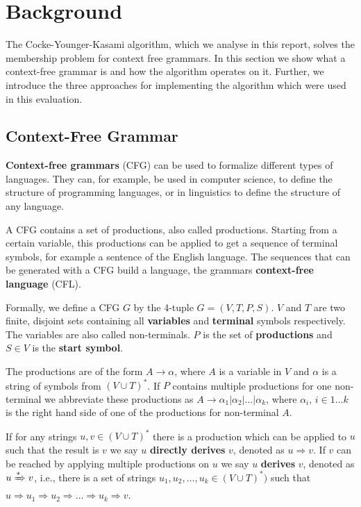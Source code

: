 \section{Background}

The Cocke-Younger-Kasami algorithm, which we analyse in this report, solves the membership problem for context free grammars.
In this section we show what a context-free grammar is and how the algorithm operates on it.
Further, we introduce the three approaches for implementing the algorithm which were used in this evaluation.

\subsection{Context-Free Grammar}

\textbf{Context-free grammars} (CFG) can be used to formalize different types of languages.
They can, for example, be used in computer science, to define the structure of programming languages, or in linguistics to define the structure of any language.

A CFG contains a set of productions, also called productions.
Starting from a certain variable, this productions can be applied to get a sequence of terminal symbols, for example a sentence of the English language.
The sequences that can be generated with a CFG build a language, the grammars \textbf{context-free language} (CFL).

Formally, we define a CFG $G$ by the 4-tuple $G=(V,T,P,S)$.
$V$ and $T$ are two finite, disjoint sets containing all \textbf{variables} and \textbf{terminal} symbols respectively.
The variables are also called non-terminals.
$P$ is the set of \textbf{productions} and $S\in V$ is the \textbf{start symbol}.

The productions are of the form $A\rightarrow\alpha$, where $A$ is a variable in $V$ and $\alpha$ is a string of symbols from $(V\cup T)^*$.
If $P$ contains multiple productions for one non-terminal we abbreviate these productions as $A\rightarrow \alpha_1 | \alpha_2 | \dots |\alpha_k $, where $\alpha_i$, $i\in {1\dots k}$ is the right hand side of one of the productions for non-terminal $A$.

If for any strings $u,v\in (V\cup T)^*$ there is a production which can be applied to $u$ such that the result is $v$ we say $u$ \textbf{directly derives} $v$, denoted as $u\Rightarrow v$.
If $v$ can be reached by applying multiple productions on $u$ we say $u$ \textbf{derives} $v$, denoted as $u\xRightarrow{*} v$, i.e., there is a set of strings $u_1, u_2, \dots, u_k\in (V\cup T)^*)$ such that $u\Rightarrow u_1 \Rightarrow u_2 \Rightarrow \dots \Rightarrow u_k \Rightarrow v$.

